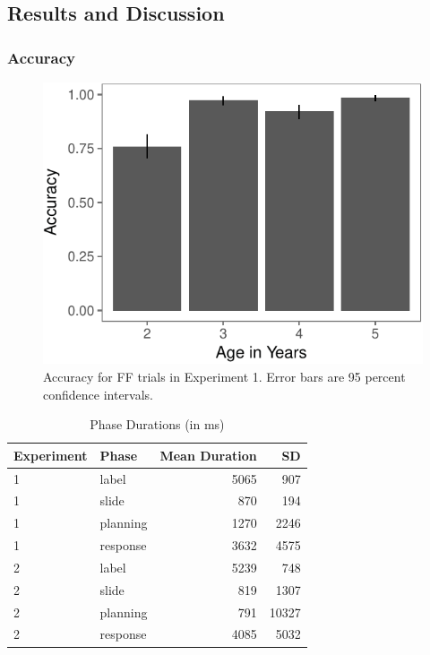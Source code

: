 \documentclass[a4paper,man,apacite,floatsintext]{apa6}
\newenvironment{CodeChunk}{}{}
\begin{document}
\subsection{Results and Discussion}\label{results-and-discussion}

\subsubsection{Accuracy}\label{accuracy}

\begin{CodeChunk}
\begin{figure}[b]

{\centering \includegraphics{figs/acc_e1-1} 

}

\caption[Accuracy for FF trials in Experiment 1]{Accuracy for FF trials in Experiment 1. Error bars are 95 percent confidence intervals.}\label{fig:acc_e1}
\end{figure}
\end{CodeChunk}

\begin{table}[b]
\centering
\begin{tabular}{llrr}
  \hline
Experiment & Phase & Mean Duration & SD \\ 
  \hline
1 & label & 5065 & 907 \\ 
  1 & slide & 870 & 194 \\ 
  1 & planning & 1270 & 2246 \\ 
  1 & response & 3632 & 4575 \\ 
   \hline
2 & label & 5239 & 748 \\ 
  2 & slide & 819 & 1307 \\ 
  2 & planning & 791 & 10327 \\ 
  2 & response & 4085 & 5032 \\ 
   \hline
\end{tabular}
\caption{Phase Durations (in ms)} 
\label{tab:phases}
\end{table}
\end{document}
